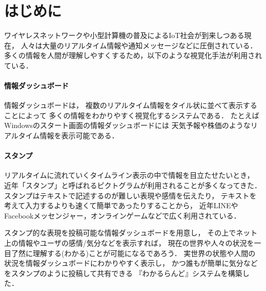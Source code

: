 \section{はじめに}
ワイヤレスネットワークや小型計算機の普及によるIoT社会が到来しつある現在，
人々は大量のリアルタイム情報や通知メッセージなどに圧倒されている．
多くの情報を人間が理解しやすくするため，以下のような視覚化手法が利用されている．

\paragraph{情報ダッシュボード}

情報ダッシュボード\cite{few}は，
複数のリアルタイム情報をタイル状に並べて表示することによって
多くの情報をわかりやすく視覚化するシステムである．
たとえばWindowsのスタート画面の情報ダッシュボードには
天気予報や株価のようなリアルタイム情報を表示可能である．

\paragraph{スタンプ}
リアルタイムに流れていくタイムライン表示の中で情報を目立たせたいとき，
近年「スタンプ」と呼ばれるピクトグラムが利用されることが多くなってきた．
スタンプはテキストで記述するのが難しい表現や感情を伝えたり，
テキストを考えて入力するよりも速くて簡単であったりすることから，
近年LINEやFacebookメッセンジャー，オンラインゲームなどで広く利用されている．
\vspace{2mm}

スタンプ的な表現を投稿可能な情報ダッシュボードを用意し，
その上でネット上の情報やユーザの感情/気分などを表示すれば，
現在の世界や人々の状況を一目了然に理解する(わかる)ことが可能になるであろう．
実世界の状態や人間の状況を情報ダッシュボードにわかりやすく表示し，
かつ誰もが簡単に気分などをスタンプのように投稿して共有できる
『わかるらんど』システムを構築した．